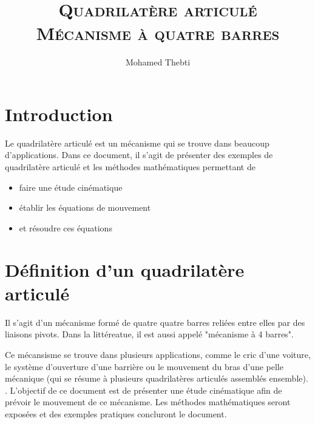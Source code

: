 \documentclass[12pt,a4paper]{article}
\title{
	\Huge\textsc{Quadrilatère articulé\\
		Mécanisme à quatre barres}
}
\author{Mohamed Thebti}
\begin{document}
\setlength{\parindent}{0mm}

\fancyhead[R]{\slshape \leftmark}

\fancyfoot[C]{}
\fancyfoot[R]{\thepage}

\maketitle
\newpage

\tableofcontents

\newpage



\section{Introduction}

Le quadrilatère articulé est un mécanisme qui se trouve dans beaucoup d'applications.
\medbreak
Dans ce document, il s'agit de présenter des exemples de quadrilatère articulé et les méthodes mathématiques permettant de

\begin{itemize}
	\item faire une étude cinématique
	\item établir les équations de mouvement
	\item et résoudre ces équations
\end{itemize}



\section{Définition d'un quadrilatère articulé}


Il s'agit d'un mécanisme formé de quatre quatre barres reliées entre elles par des liaisons pivots. Dans la littéreatue, il est aussi appelé "mécanisme à 4 barres".

\medbreak
Ce mécansisme se trouve dans plusieurs applications, comme le cric d'une voiture, le système d'ouverture d'une barrière ou le mouvement du bras d'une pelle mécanique (qui se résume à plusieurs quadrilatères articulés assemblés ensemble). 
\medbreak
. 
\medbreak
L'objectif de ce document est de présenter une étude cinématique afin de prévoir le mouvement de ce mécanisme. Les méthodes mathématiques seront exposées et des exemples pratiques concluront le document. 
\end{document}
